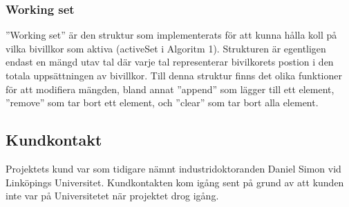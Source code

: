 \subsubsection{Working set}
''Working set'' är den struktur som implementerats för att kunna hålla koll på vilka bivillkor som aktiva (activeSet i Algoritm 1). Strukturen är egentligen endast en mängd utav tal där varje tal representerar bivilkorets postion i den totala uppsättningen av bivillkor. Till denna struktur finns det olika funktioner för att modifiera mängden, bland annat ''append'' som lägger till ett element, ''remove'' som tar bort ett element, och ''clear'' som tar bort alla element.




\subsection{Kundkontakt}
Projektets kund var som tidigare nämnt industridoktoranden Daniel Simon vid Linköpings Universitet. Kundkontakten kom igång sent på grund av att kunden inte var på Universitetet när projektet drog igång. 

